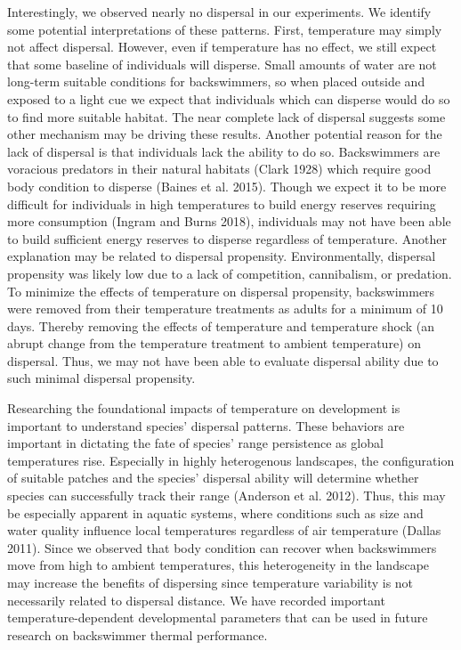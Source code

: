 \documentclass[
]{article}
\begin{document}
Interestingly, we observed nearly no dispersal in our experiments. We
identify some potential interpretations of these patterns. First,
temperature may simply not affect dispersal. However, even if
temperature has no effect, we still expect that some baseline of
individuals will disperse. Small amounts of water are not long-term
suitable conditions for backswimmers, so when placed outside and exposed
to a light cue we expect that individuals which can disperse would do so
to find more suitable habitat. The near complete lack of dispersal
suggests some other mechanism may be driving these results. Another
potential reason for the lack of dispersal is that individuals lack the
ability to do so. Backswimmers are voracious predators in their natural
habitats (Clark 1928) which require good body condition to disperse
(Baines et al. 2015). Though we expect it to be more difficult for
individuals in high temperatures to build energy reserves requiring more
consumption (Ingram and Burns 2018), individuals may not have been able
to build sufficient energy reserves to disperse regardless of
temperature. Another explanation may be related to dispersal propensity.
Environmentally, dispersal propensity was likely low due to a lack of
competition, cannibalism, or predation. To minimize the effects of
temperature on dispersal propensity, backswimmers were removed from
their temperature treatments as adults for a minimum of 10 days. Thereby
removing the effects of temperature and temperature shock (an abrupt
change from the temperature treatment to ambient temperature) on
dispersal. Thus, we may not have been able to evaluate dispersal ability
due to such minimal dispersal propensity.

Researching the foundational impacts of temperature on development is
important to understand species' dispersal patterns. These behaviors are
important in dictating the fate of species' range persistence as global
temperatures rise. Especially in highly heterogenous landscapes, the
configuration of suitable patches and the species' dispersal ability
will determine whether species can successfully track their range
(Anderson et al. 2012). Thus, this may be especially apparent in aquatic
systems, where conditions such as size and water quality influence local
temperatures regardless of air temperature (Dallas 2011). Since we
observed that body condition can recover when backswimmers move from
high to ambient temperatures, this heterogeneity in the landscape may
increase the benefits of dispersing since temperature variability is not
necessarily related to dispersal distance. We have recorded important
temperature-dependent developmental parameters that can be used in
future research on backswimmer thermal performance.
\end{document}
